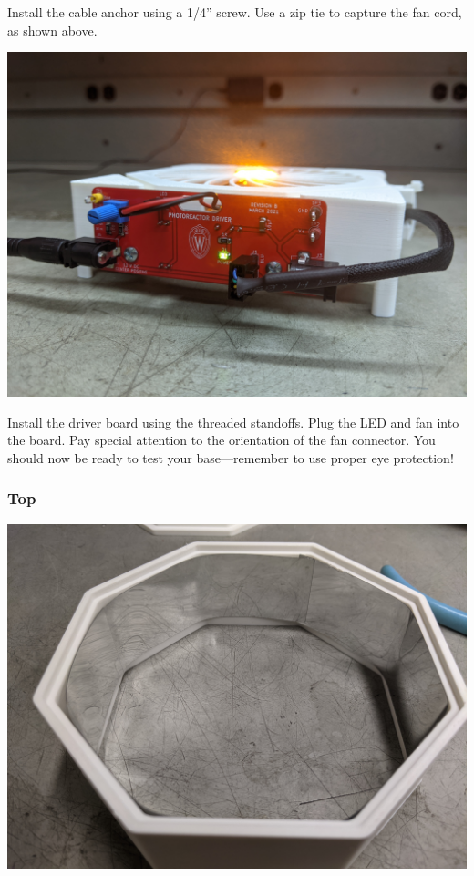 \documentclass[11pt]{article}
\begin{document}
Install the cable anchor using a 1/4'' screw.
Use a zip tie to capture the fan cord, as shown above.

\clearpage

\begin{center}
  \includegraphics[width=\textwidth/2]{"./driver-on-base.jpg"}
\end{center}

Install the driver board using the threaded standoffs.
Plug the LED and fan into the board.
Pay special attention to the orientation of the fan connector.
You should now be ready to test your base---remember to use proper eye protection!

\clearpage
\subsubsection{Top} \label{SEC:top}

\begin{center}
  \includegraphics[width=\textwidth/2]{"./reflector.jpg"}
\end{center}
\end{document}
